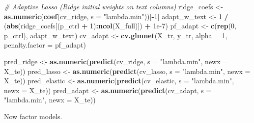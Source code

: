 \documentclass[
]{article}
\newenvironment{Shaded}{\begin{snugshade}}{\end{snugshade}}
\newcommand{\AttributeTok}[1]{\textcolor[rgb]{0.13,0.29,0.53}{#1}}
\newcommand{\CommentTok}[1]{\textcolor[rgb]{0.56,0.35,0.01}{\textit{#1}}}
\newcommand{\DecValTok}[1]{\textcolor[rgb]{0.00,0.00,0.81}{#1}}
\newcommand{\FloatTok}[1]{\textcolor[rgb]{0.00,0.00,0.81}{#1}}
\newcommand{\FunctionTok}[1]{\textcolor[rgb]{0.13,0.29,0.53}{\textbf{#1}}}
\newcommand{\NormalTok}[1]{#1}
\newcommand{\OtherTok}[1]{\textcolor[rgb]{0.56,0.35,0.01}{#1}}
\newcommand{\SpecialCharTok}[1]{\textcolor[rgb]{0.81,0.36,0.00}{\textbf{#1}}}
\newcommand{\StringTok}[1]{\textcolor[rgb]{0.31,0.60,0.02}{#1}}
\begin{document}
\begin{Shaded}
\begin{Highlighting}[]
\CommentTok{\# Adaptive Lasso (Ridge initial weights on text columns)}
\NormalTok{ridge\_coefs  }\OtherTok{\textless{}{-}} \FunctionTok{as.numeric}\NormalTok{(}\FunctionTok{coef}\NormalTok{(cv\_ridge, }\AttributeTok{s =} \StringTok{"lambda.min"}\NormalTok{))[}\SpecialCharTok{{-}}\DecValTok{1}\NormalTok{]}
\NormalTok{adapt\_w\_text }\OtherTok{\textless{}{-}} \DecValTok{1} \SpecialCharTok{/}\NormalTok{ (}\FunctionTok{abs}\NormalTok{(ridge\_coefs[(p\_ctrl }\SpecialCharTok{+} \DecValTok{1}\NormalTok{)}\SpecialCharTok{:}\FunctionTok{ncol}\NormalTok{(X\_full)]) }\SpecialCharTok{+} \FloatTok{1e{-}7}\NormalTok{)}
\NormalTok{pf\_adapt     }\OtherTok{\textless{}{-}} \FunctionTok{c}\NormalTok{(}\FunctionTok{rep}\NormalTok{(}\DecValTok{0}\NormalTok{, p\_ctrl), adapt\_w\_text)}
\NormalTok{cv\_adapt     }\OtherTok{\textless{}{-}} \FunctionTok{cv.glmnet}\NormalTok{(X\_tr, y\_tr, }\AttributeTok{alpha =} \DecValTok{1}\NormalTok{, }\AttributeTok{penalty.factor =}\NormalTok{ pf\_adapt)}

\NormalTok{pred\_ridge   }\OtherTok{\textless{}{-}} \FunctionTok{as.numeric}\NormalTok{(}\FunctionTok{predict}\NormalTok{(cv\_ridge,   }\AttributeTok{s =} \StringTok{"lambda.min"}\NormalTok{, }\AttributeTok{newx =}\NormalTok{ X\_te))}
\NormalTok{pred\_lasso   }\OtherTok{\textless{}{-}} \FunctionTok{as.numeric}\NormalTok{(}\FunctionTok{predict}\NormalTok{(cv\_lasso,   }\AttributeTok{s =} \StringTok{"lambda.min"}\NormalTok{, }\AttributeTok{newx =}\NormalTok{ X\_te))}
\NormalTok{pred\_elastic }\OtherTok{\textless{}{-}} \FunctionTok{as.numeric}\NormalTok{(}\FunctionTok{predict}\NormalTok{(cv\_elastic, }\AttributeTok{s =} \StringTok{"lambda.min"}\NormalTok{, }\AttributeTok{newx =}\NormalTok{ X\_te))}
\NormalTok{pred\_adapt   }\OtherTok{\textless{}{-}} \FunctionTok{as.numeric}\NormalTok{(}\FunctionTok{predict}\NormalTok{(cv\_adapt,   }\AttributeTok{s =} \StringTok{"lambda.min"}\NormalTok{, }\AttributeTok{newx =}\NormalTok{ X\_te))}
\end{Highlighting}
\end{Shaded}

Now factor models.
\end{document}
